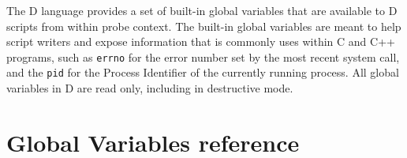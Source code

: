 The D language provides a set of built-in global variables that are
available to D scripts from within probe context.  The built-in global
variables are meant to help script writers and expose information that
is commonly uses within C and C++ programs, such as \verb|errno| for
the error number set by the most recent system call, and the
\verb|pid| for the Process Identifier of the currently running
process.  All global variables in D are read only, including in
destructive mode.

\section{Global Variables reference}





























